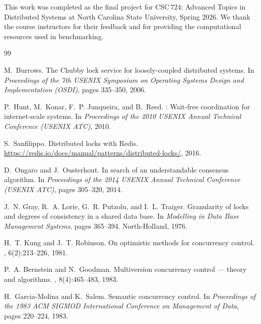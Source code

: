 \documentclass[sigconf]{acmart}
\begin{document}
\begin{acks}
This work was completed as the final project for CSC\,724: Advanced Topics in Distributed
Systems at North Carolina State University, Spring 2026. We thank the course instructors
for their feedback and for providing the computational resources used in benchmarking.
\end{acks}


\begin{thebibliography}{99}

M.~Burrows.
\newblock The {Chubby} lock service for loosely-coupled distributed systems.
\newblock In {\em Proceedings of the 7th USENIX Symposium on Operating Systems
  Design and Implementation (OSDI)}, pages 335--350, 2006.

P.~Hunt, M.~Konar, F.~P. Junqueira, and B.~Reed.
: Wait-free coordination for internet-scale systems.
\newblock In {\em Proceedings of the 2010 USENIX Annual Technical Conference
  (USENIX ATC)}, 2010.

S.~Sanfilippo.
\newblock Distributed locks with {Redis}.
\newblock \url{https://redis.io/docs/manual/patterns/distributed-locks/}, 2016.

D.~Ongaro and J.~Ousterhout.
\newblock In search of an understandable consensus algorithm.
\newblock In {\em Proceedings of the 2014 USENIX Annual Technical Conference
  (USENIX ATC)}, pages 305--320, 2014.

J.~N. Gray, R.~A. Lorie, G.~R. Putzolu, and I.~L. Traiger.
\newblock Granularity of locks and degrees of consistency in a shared data base.
\newblock In {\em Modelling in Data Base Management Systems}, pages 365--394.
  North-Holland, 1976.

H.~T. Kung and J.~T. Robinson.
\newblock On optimistic methods for concurrency control.
, 6(2):213--226, 1981.

P.~A. Bernstein and N.~Goodman.
\newblock Multiversion concurrency control --- theory and algorithms.
, 8(4):465--483, 1983.

H.~Garcia-Molina and K.~Salem.
\newblock Semantic concurrency control.
\newblock In {\em Proceedings of the 1983 ACM SIGMOD International Conference
  on Management of Data}, pages 220--224, 1983.


\end{thebibliography}
\end{document}
